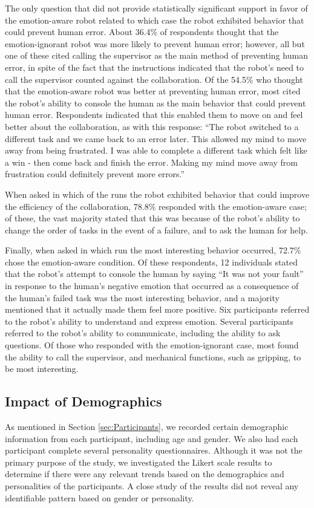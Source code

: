 \documentclass[12pt]{report}
\begin{document}
The only question that did not provide statistically significant support in
favor of the emotion-aware robot related to which case the robot exhibited
behavior that could prevent human error. About 36.4\% of respondents thought
that the emotion-ignorant robot was more likely to prevent human error; however, all
but one of these cited calling the supervisor as the main method of preventing
human error, in spite of the fact that the instructions indicated that the
robot's need to call the supervisor counted against the collaboration. Of the
54.5\% who thought that the emotion-aware robot was better at preventing human
error, most cited the robot's ability to console the human as the main behavior
that could prevent human error. Respondents indicated that this enabled them to
move on and feel better about the collaboration, as with this response: ``The
robot switched to a different task and we came back to an error later. This
allowed my mind to move away from being frustrated. I was able to complete a
different task which felt like a win - then come back and finish the error.
Making my mind move away from frustration could definitely prevent more
errors.''

When asked in which of the runs the robot exhibited behavior that could improve
the efficiency of the collaboration, 78.8\% responded with the emotion-aware
case; of these, the vast majority stated that this was because of the robot's
ability to change the order of tasks in the event of a failure, and to ask the
human for help.

Finally, when asked in which run the most interesting behavior occurred,
72.7\% chose the emotion-aware condition. Of these respondents, 12
individuals stated that the robot's attempt to console the human by saying ``It
was not your fault'' in response to the human's negative emotion that occurred
as a consequence of the human's failed task was the most interesting behavior,
and a majority mentioned that it actually made them feel more positive. Six
participants referred to the robot's ability to understand and express emotion.
Several participants referred to the robot's ability to communicate, including
the ability to ask questions. Of those who responded with the emotion-ignorant
case, most found the ability to call the supervisor, and mechanical functions,
such as gripping, to be most interesting.

\subsection{Impact of Demographics} 
As mentioned in Section \ref{sec:Participants}, we recorded certain demographic
information from each participant, including age and gender. We also had each
participant complete several personality questionnaires. Although it was not the
primary purpose of the study, we investigated the Likert scale results to
determine if there were any relevant trends based on the demographics and
personalities of the participants. A close study of the results did  not reveal
any identifiable pattern based on gender or personality.
\end{document}
